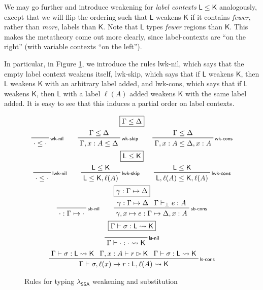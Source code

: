 \documentclass[acmsmall,screen,review]{acmart}
\newcommand{\ms}[1]{\ensuremath{\mathsf{#1}}}
\newcommand{\bhyp}[2]{#1 : #2}
\newcommand{\lhyp}[2]{#1(#2)}
\newcommand{\rle}[1]{{\scriptsize\textsf{#1}}}
\newcommand{\hasty}[4]{#1 \vdash_{#2} #3: {#4}}
\newcommand{\haslb}[3]{#1 \vdash #2 \rhd #3}
\newcommand{\issubst}[3]{#1: #2 \mapsto #3}
\newcommand{\lbsubst}[4]{#1 \vdash #2: #3 \rightsquigarrow #4}
\newcommand{\brle}[1]{{\textsf{#1}}}
\newcommand{\isotopessa}{\(\lambda_{\ms{SSA}}\)}
\begin{document}
We may go further and introduce weakening for \emph{label contexts} $\ms{L} \leq \ms{K}$
analogously, except that we will flip the ordering such that $\ms{L}$ weakens $\ms{K}$ if it
contains \emph{fewer}, rather than \emph{more}, labels than $\ms{K}$. 
Note that $\ms{L}$ types \emph{fewer} regions than $\ms{K}$. This makes the
metatheory come out more clearly, since label-contexts
are ``on the right'' (with variable contexts ``on the left'').


In particular, in Figure
\ref{fig:ssa-meta-rules}, we introduce the rules \brle{lwk-nil}, which says that the empty label
context weakens itself, \brle{lwk-skip}, which says that if $\ms{L}$ weakens $\ms{K}$, then $\ms{L}$
weakens $\ms{K}$ with an arbitrary label added, and \brle{lwk-cons}, which says that if $\ms{L}$
weakens $\ms{K}$, then $\ms{L}$ with a label $\lhyp{\ell}{A}$ added weakens $\ms{K}$ with the same
label added. It is easy to see that this induces a partial order on label contexts.

\begin{figure}
  \begin{gather*}
    \boxed{\Gamma \leq \Delta} \\
    \prftree[r]{\rle{wk-nil}}{}{\cdot \leq \cdot} \qquad
    \prftree[r]{\rle{wk-skip}}{\Gamma \leq \Delta}{\Gamma, \bhyp{x}{A} \leq \Delta} \qquad
    \prftree[r]{\rle{wk-cons}}{\Gamma \leq \Delta}
      {\Gamma, \bhyp{x}{A} \leq \Delta, \bhyp{x}{A}} \\
    \boxed{\ms{L} \leq \ms{K}} \\
    \prftree[r]{\rle{lwk-nil}}{}{\cdot \leq \cdot} \qquad
    \prftree[r]{\rle{lwk-skip}}{\ms{L} \leq \ms{K}}{\ms{L} \leq \ms{K}, \lhyp{\ell}{A}} \qquad
    \prftree[r]{\rle{lwk-cons}}{\ms{L} \leq \ms{K}}
      {\ms{L}, \lhyp{\ell}{A} \leq \ms{K}, \lhyp{\ell}{A}} \\
    \boxed{\issubst{\gamma}{\Gamma}{\Delta}} \\
    \prftree[r]{\rle{sb-nil}}{}{\issubst{\cdot}{\Gamma}{\cdot}} \qquad
    \prftree[r]{\rle{sb-cons}}{\issubst{\gamma}{\Gamma}{\Delta}}{\hasty{\Gamma}{\bot}{e}{A}}
      {\issubst{\gamma, x \mapsto e}{\Gamma}{\Delta, \bhyp{x}{A}}}
       \\
    \boxed{\lbsubst{\Gamma}{\sigma}{\ms{L}}{\ms{K}}} \\
    \prftree[r]{\rle{ls-nil}}{}{\lbsubst{\Gamma}{\cdot}{\cdot}{\ms{K}}}
    \\
    \prftree[r]{\rle{ls-cons}}
      {\lbsubst{\Gamma}{\sigma}{\ms{L}}{\ms{K}}}{\haslb{\Gamma, \bhyp{x}{A}}{r}{\ms{K}}}
      {\lbsubst{\Gamma}{\sigma}{\ms{L}}{\ms{K}}}
      {\lbsubst{\Gamma}{\sigma, \ell(x) \mapsto r}{\ms{L}, \lhyp{\ell}{A}}{\ms{K}}}
  \end{gather*}
  \caption{Rules for typing \isotopessa{} weakening and substitution}
  \Description{}
  \label{fig:ssa-meta-rules}
\end{figure}
\end{document}
